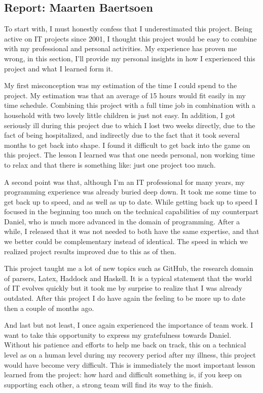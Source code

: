 
\subsection{Report: Maarten Baertsoen}
\label{subsec:assessment-maarten}
To start with, I must honestly confess that I underestimated this project.
Being active on IT projects since 2001, I thought this project would be easy to combine with my professional and personal activities.
My experience has proven me wrong, in this section, I'll provide my personal insights in how I experienced this project and what I learned form it.

My first misconception was my estimation of the time I could spend to the project.
My estimation was that an average of 15 hours would fit easily in my time schedule.
Combining this project with a full time job in combination with a household with two lovely little children is just not easy.
In addition, I got seriously ill during this project due to which I lost two weeks directly, due to the fact of being hospitalized, and indirectly due to the fact that it took several months to get back into shape.
I found it difficult to get back into the game on this project.
The lesson I learned was that one needs personal, non working time to relax and that there is something like: just one project too much.

A second point was that, although I'm an IT professional for many years, my programming experience was already buried deep down.
It took me some time to get back up to speed, and as well as up to date.
While getting back up to speed I focused in the beginning too much on the technical capabilities of my counterpart Daniel, who is much more advanced in the domain of programming. 
After a while, I released that it was not needed to both have the same expertise, and that we better could be complementary instead of identical.
The speed in which we realized project results improved due to this as of then.

This project taught me a lot of new topics such as GitHub, the research domain of parsers, Latex, Haddock and Haskell.
It is a typical statement that the world of IT evolves quickly but it took me by surprise to realize that I was already outdated.
After this project I do have again the feeling to be more up to date then a couple of months ago.

And last but not least, I once again experienced the importance of team work.
I want to take this opportunity to express my gratefulness towards Daniel.
Without his patience and efforts to help me back on track, this on a technical level as on a human level during my recovery period after my illness, this project would have become very difficult. 
This is immediately the most important lesson learned from the project: how hard and difficult something is, if you keep on supporting each other, a strong team will find its way to the finish.




